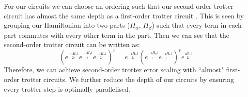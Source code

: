 \documentclass[aps,floatfix,10pt,amssymb,amsfont,amsmath,superscriptaddress,float,nofootinbib,longbibliography,nobalancelastpage,twocolumn]{revtex4-2}
\begin{document}
For our circuits we can choose an ordering such that our second-order trotter circuit has almost the same depth as a first-order trotter circuit \cite{layden2022first}. This is seen by grouping our Hamiltonian into two parts ($H_\alpha$, $H_\beta$) such that every term in each part commutes with every other term in the part. Then we can see that the second-order trotter circuit can be written as:
\begin{equation}
    \left(e^{\frac{ -iH_\alpha t}{2r}}e^{\frac{ -iH_\beta t}{r}} e^{\frac{ -iH_\alpha t}{2r}}\right)^r = e^{\frac{ -iH_\alpha t}{2r}}\left(e^{\frac{ -iH_\beta t}{r}} e^{\frac{ -iH_\alpha t}{r}}\right)^r e^{\frac{ iH_\alpha t}{2r}}
\end{equation}
Therefore, we can achieve second-order trotter error scaling with ``almost" first-order trotter circuits. We further reduce the depth of our circuits by ensuring every trotter step is optimally parallelised.
\end{document}
